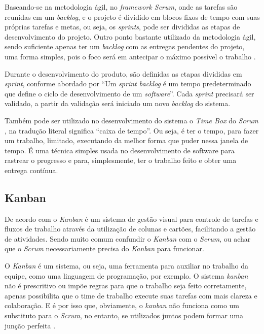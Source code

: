      Baseando-se na metodologia ágil, no \textit{framework Scrum}, onde as tarefas são reunidas em um  \textit{backlog}, e o projeto é dividido em blocos fixos de tempo com suas próprias tarefas e metas, ou seja, os \textit{sprints}, pode ser divididas as etapas de desenvolvimento do projeto. Outro ponto bastante utilizado da metodologia ágil, sendo suficiente apenas ter um \textit{backlog} com as entregas pendentes do projeto, uma forma simples, pois o foco será em antecipar o máximo possível o trabalho \cite{juliana}.
    
    Durante o desenvolvimento do produto, são definidas as etapas divididas em \textit{sprint}, conforme abordado por  “Um \textit{sprint backlog} é um tempo predeterminado que define o ciclo de desenvolvimento de um  \textit{software}”. Cada \textit{sprint} precisará ser validado, a partir da validação será iniciado um novo \textit{backlog} do sistema. 
    
    Também pode ser utilizado no desenvolvimento do sistema o \textit{Time Box} do \textit{Scrum} , na tradução literal significa “caixa de tempo”. Ou seja, é ter o tempo, para fazer um trabalho, limitado, executando da melhor forma que puder nessa janela de tempo. É uma técnica simples usada no desenvolvimento de software para rastrear o progresso e para, simplesmente, ter o trabalho feito e obter uma entrega contínua.
    
    
\subsection{Kanban}

    De acordo com  o \textit{Kanban} é um sistema de gestão visual para controle de tarefas e fluxos de trabalho através da utilização de colunas e cartões, facilitando a gestão de atividades. Sendo muito comum confundir o \textit{Kanban} com o \textit{Scrum}, ou achar que o \textit{Scrum} necessariamente precisa do \textit{Kanban} para funcionar.   
    
    
    O \textit{Kanban} é um sistema, ou seja, uma ferramenta para auxiliar no trabalho da equipe, como uma linguagem de programação, por exemplo. O sistema \textit{kanban} não é prescritivo ou impõe regras para que o trabalho seja feito corretamente, apenas possibilita que o time de trabalho execute suas tarefas com mais clareza e colaboração. E é por isso que, obviamente, o \textit{kanban} não funciona como um substituto para o \textit{Scrum}, no entanto, se utilizados juntos podem formar uma junção perfeita \cite{kanban}.
    
